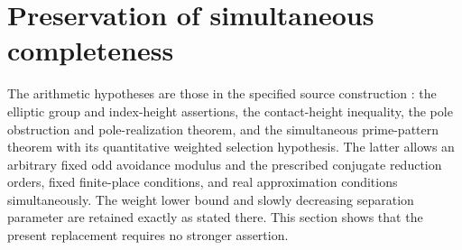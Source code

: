 \documentclass[11pt,a4paper]{article}
\theoremstyle{remark}\newtheorem{remark}[theorem]{Remark}
\begin{document}
\section{Preservation of simultaneous completeness}
The arithmetic hypotheses are those in the specified source construction
\cite[Section~2]{Source}: the elliptic group and index-height assertions,
the contact-height inequality, the pole obstruction and pole-realization
theorem, and the simultaneous prime-pattern theorem with its quantitative
weighted selection hypothesis. The latter allows an arbitrary fixed odd
avoidance modulus and the prescribed conjugate reduction orders, fixed
finite-place conditions, and real approximation conditions simultaneously.
The weight lower bound and slowly decreasing separation parameter are
retained exactly as stated there. This section shows that the present
replacement requires no stronger assertion.
\end{document}
